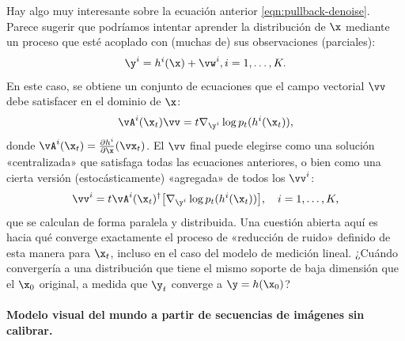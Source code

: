\documentclass[../../book-main_es.tex]{subfiles}
\begin{document}
\begin{remark}
    {Hay algo muy interesante sobre la ecuación anterior
        \eqref{eqn:pullback-denoise}. Parece sugerir que podríamos
        intentar aprender la distribución de $\x$ mediante un proceso que
        esté acoplado con (muchas de) sus observaciones (parciales):
        \begin{equation}
            \y^i = h^i(\x) +\vw^i, i =1, \ldots, K.
        \end{equation} 
        En este caso, se obtiene un conjunto de ecuaciones
        que el campo vectorial $\vv$ debe satisfacer en el dominio de $\x$:
        \begin{equation}
            \vA^i(\x_t) \vv = t \nabla_{\y^i} \log p_t(h^i(\x_t)),
            \label{eqn:federated-pushforward}
        \end{equation}
        donde $\vA^i(\x_t) = \frac{\partial h^i}{\partial
        \x}(\vx_t)$. El $\vv$ final puede elegirse como una
        solución «centralizada» que satisfaga todas las ecuaciones anteriores,
        o bien como una cierta
        versión (estocásticamente) «agregada» de todos los $\vv^i$:
        \begin{equation}
            \vv^i = t\vA^i(\x_t)^\dagger \big[\nabla_{\y^i} \log
            p_t(h^i(\x_t))\big], \quad i = 1, \ldots, K,
        \end{equation}
        que se calculan de forma paralela y distribuida. Una cuestión
        abierta aquí es hacia qué converge exactamente el proceso de «reducción de ruido»
        definido de esta manera para $\x_t$, incluso en el caso del modelo de medición
        lineal. ¿Cuándo convergería a una distribución que tiene el
        mismo soporte de baja dimensión que el $\x_0$ original, a medida que $\y_t$
    converge a $\y = h(\x_0)$? }
\end{remark}

\paragraph{Modelo visual del mundo a partir de secuencias de imágenes sin calibrar.}
\end{document}
